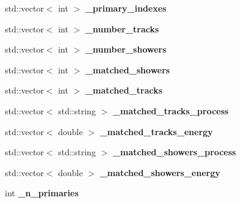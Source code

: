 \begin{DoxyCompactItemize}
\item 
\hypertarget{group__lee_ga3020305a22a83591e103b8124140cea6}{std\-::vector$<$ int $>$ {\bfseries \-\_\-primary\-\_\-indexes}}\label{group__lee_ga3020305a22a83591e103b8124140cea6}

\item 
\hypertarget{group__lee_ga413d54bca989124f2aaec5837c930a22}{std\-::vector$<$ int $>$ {\bfseries \-\_\-number\-\_\-tracks}}\label{group__lee_ga413d54bca989124f2aaec5837c930a22}

\item 
\hypertarget{group__lee_ga636e7f5eece11bbd0d0188ea073c1ee5}{std\-::vector$<$ int $>$ {\bfseries \-\_\-number\-\_\-showers}}\label{group__lee_ga636e7f5eece11bbd0d0188ea073c1ee5}

\item 
\hypertarget{group__lee_ga51ecdfb466b876fde01072e95408bedb}{std\-::vector$<$ int $>$ {\bfseries \-\_\-matched\-\_\-showers}}\label{group__lee_ga51ecdfb466b876fde01072e95408bedb}

\item 
\hypertarget{group__lee_ga31e3e0db2ea3526c148ab1d98cd3b35c}{std\-::vector$<$ int $>$ {\bfseries \-\_\-matched\-\_\-tracks}}\label{group__lee_ga31e3e0db2ea3526c148ab1d98cd3b35c}

\item 
\hypertarget{group__lee_gaf01f5331ecedef37034b5e8a12aac314}{std\-::vector$<$ std\-::string $>$ {\bfseries \-\_\-matched\-\_\-tracks\-\_\-process}}\label{group__lee_gaf01f5331ecedef37034b5e8a12aac314}

\item 
\hypertarget{group__lee_ga3cd167b0e0e259df8c58bed1190edd85}{std\-::vector$<$ double $>$ {\bfseries \-\_\-matched\-\_\-tracks\-\_\-energy}}\label{group__lee_ga3cd167b0e0e259df8c58bed1190edd85}

\item 
\hypertarget{group__lee_ga68fdfb9878716c7d99651a98e294818d}{std\-::vector$<$ std\-::string $>$ {\bfseries \-\_\-matched\-\_\-showers\-\_\-process}}\label{group__lee_ga68fdfb9878716c7d99651a98e294818d}

\item 
\hypertarget{group__lee_ga8c616d054941206de6a91e7859ac4209}{std\-::vector$<$ double $>$ {\bfseries \-\_\-matched\-\_\-showers\-\_\-energy}}\label{group__lee_ga8c616d054941206de6a91e7859ac4209}

\item 
\hypertarget{group__lee_ga9cb9605f2fe0af2464f936651659ad91}{int {\bfseries \-\_\-n\-\_\-primaries}}\label{group__lee_ga9cb9605f2fe0af2464f936651659ad91}


\end{DoxyCompactItemize}
